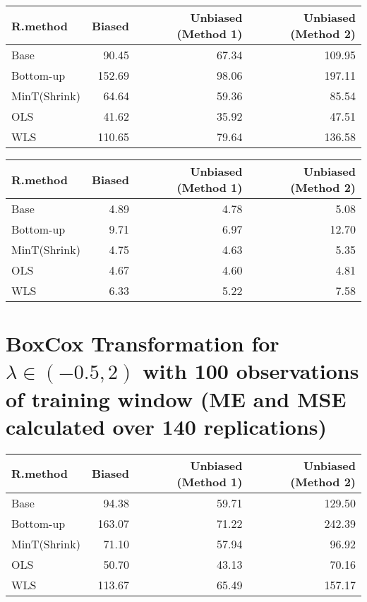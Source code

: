 \documentclass[
]{article}
\begin{document}
\begin{tabular}{l|r|r|r}
\hline
R.method & Biased & Unbiased (Method 1) & Unbiased (Method 2)\\
\hline
Base & 90.45 & 67.34 & 109.95\\
\hline
Bottom-up & 152.69 & 98.06 & 197.11\\
\hline
MinT(Shrink) & 64.64 & 59.36 & 85.54\\
\hline
OLS & 41.62 & 35.92 & 47.51\\
\hline
WLS & 110.65 & 79.64 & 136.58\\
\hline
\end{tabular}

\begin{tabular}{l|r|r|r}
\hline
R.method & Biased & Unbiased (Method 1) & Unbiased (Method 2)\\
\hline
Base & 4.89 & 4.78 & 5.08\\
\hline
Bottom-up & 9.71 & 6.97 & 12.70\\
\hline
MinT(Shrink) & 4.75 & 4.63 & 5.35\\
\hline
OLS & 4.67 & 4.60 & 4.81\\
\hline
WLS & 6.33 & 5.22 & 7.58\\
\hline
\end{tabular}

\hypertarget{boxcox-transformation-for-lambda-in--0.52-with-100-observations-of-training-window-me-and-mse-calculated-over-140-replications}{%
\section{\texorpdfstring{BoxCox Transformation for
\(\lambda \in (-0.5,2)\) with 100 observations of training window (ME
and MSE calculated over 140
replications)}{BoxCox Transformation for \textbackslash lambda \textbackslash in (-0.5,2) with 100 observations of training window (ME and MSE calculated over 140 replications)}}\label{boxcox-transformation-for-lambda-in--0.52-with-100-observations-of-training-window-me-and-mse-calculated-over-140-replications}}

\begin{tabular}{l|r|r|r}
\hline
R.method & Biased & Unbiased (Method 1) & Unbiased (Method 2)\\
\hline
Base & 94.38 & 59.71 & 129.50\\
\hline
Bottom-up & 163.07 & 71.22 & 242.39\\
\hline
MinT(Shrink) & 71.10 & 57.94 & 96.92\\
\hline
OLS & 50.70 & 43.13 & 70.16\\
\hline
WLS & 113.67 & 65.49 & 157.17\\
\hline
\end{tabular}
\end{document}
